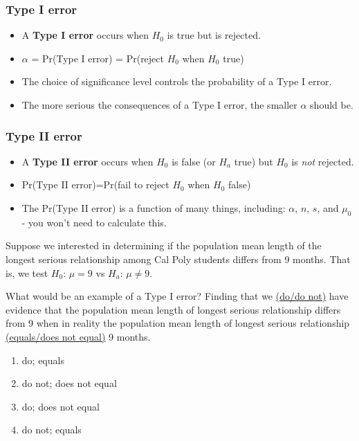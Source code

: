 \begin{frame}
\frametitle{Type I error}
\begin{itemize}
    \item
    A \textbf{Type I error} occurs when $H_0$ is true but is rejected.
    \item
    $\alpha$ = Pr(Type I error) = Pr(reject $H_0$ when  $H_0$ true)
    \item
    The choice of significance level controls the probability of a Type I error.
    \item
    The more serious the consequences of a Type I error, the smaller $\alpha$ should be.
\end{itemize}
\end{frame}


\begin{frame}
\frametitle{Type II error}
\begin{itemize}
    \item
    A \textbf{Type II error} occurs when $H_0$ is false (or $H_a$ true) but $H_0$ is \emph{not} rejected.
    \item[]
    Pr(Type II error)=Pr(fail to reject $H_0$ when $H_0$ false)
    \item
    The Pr(Type II error) is a function of many things, including: $\alpha$, $n$, $s$, and $\mu_0$ - you won't need to calculate this.
\end{itemize}
\end{frame}

\begin{frame}
Suppose we interested in determining if the population mean length of the longest serious relationship among Cal Poly students differs from 9 months.  That is, we test $H_0$: $\mu=9$ vs $H_a$: $\mu\neq 9$.
\begin{clicker}{What would be an example of a Type I error? Finding that we \underline{(do/do not)} have evidence that the population mean length of longest serious relationship differs from 9 when in reality the population mean length of longest serious relationship \underline{(equals/does not equal)} 9 months.}
\begin{enumerate}
    \item
    do; equals 
    \item
    do not; does not equal 
    \item
    do; does not equal
    \item
    do not; equals 
\end{enumerate}
\end{clicker}
\end{frame}


